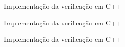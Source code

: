 \begin{frame}[fragile]{Implementação da verificação em C++}
\end{frame}

\begin{frame}[fragile]{Implementação da verificação em C++}
\end{frame}

\begin{frame}[fragile]{Implementação da verificação em C++}
\end{frame}
